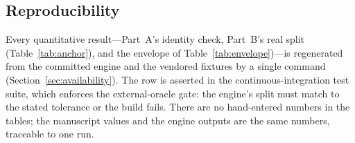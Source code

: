 \subsection{Reproducibility}
\label{sec:reproducibility}

Every quantitative result---Part~A's identity check, Part~B's real split
(Table~\ref{tab:anchor}), and the envelope of Table~\ref{tab:envelope})---is
regenerated from the committed engine and the vendored fixtures by a single command
(Section~\ref{sec:availability}). The \Validated{} row is asserted in the
continuous-integration test suite, which enforces the external-oracle gate: the engine's
split must match  to the stated tolerance or the build fails. There
are no hand-entered numbers in the tables; the manuscript values and the engine outputs
are the same numbers, traceable to one run.
